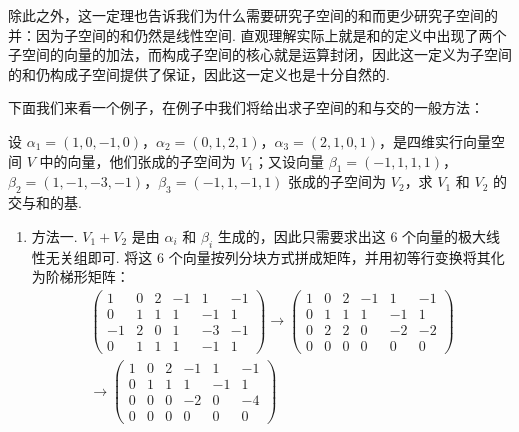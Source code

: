 除此之外，这一定理也告诉我们为什么需要研究子空间的和而更少研究子空间的并：因为子空间的和仍然是线性空间. 直观理解实际上就是和的定义中出现了两个子空间的向量的加法，而构成子空间的核心就是运算封闭，因此这一定义为子空间的和仍构成子空间提供了保证，因此这一定义也是十分自然的.

下面我们来看一个例子，在例子中我们将给出求子空间的和与交的一般方法：
\begin{example}{}{}
    设 $\alpha_1 = (1, 0, -1, 0)$，$\alpha_2 = (0, 1, 2, 1)$，$\alpha_3 = (2, 1, 0, 1)$，是四维实行向量空间 $V$ 中的向量，他们张成的子空间为 $V_1$；又设向量 $\beta_1 = (-1, 1, 1, 1)$，$\beta_2 = (1, -1, -3, -1)$，$\beta_3 = (-1, 1, -1, 1)$ 张成的子空间为 $V_2$，求 $V_1$ 和 $V_2$ 的交与和的基.
\end{example}

\begin{solution}
    \begin{enumerate}
        \item 方法一.  $V_1 +V_2$ 是由 $\alpha_i$ 和 $\beta_i$ 生成的，因此只需要求出这 $6$ 个向量的极大线性无关组即可. 将这 $6$ 个向量按列分块方式拼成矩阵，并用初等行变换将其化为阶梯形矩阵：
              \begin{align*}
                  \begin{pmatrix}
                      1  & 0 & 2 & -1 & 1  & -1 \\
                      0  & 1 & 1 & 1  & -1 & 1  \\
                      -1 & 2 & 0 & 1  & -3 & -1 \\
                      0  & 1 & 1 & 1  & -1 & 1
                  \end{pmatrix}
                  \xrightarrow{}
                  \begin{pmatrix}
                      1 & 0 & 2 & -1 & 1  & -1 \\
                      0 & 1 & 1 & 1  & -1 & 1  \\
                      0 & 2 & 2 & 0  & -2 & -2 \\
                      0 & 0 & 0 & 0  & 0  & 0
                  \end{pmatrix} \\
                  \xrightarrow{}
                  \begin{pmatrix}
                      1 & 0 & 2 & -1 & 1  & -1 \\
                      0 & 1 & 1 & 1  & -1 & 1  \\
                      0 & 0 & 0 & -2 & 0  & -4 \\
                      0 & 0 & 0 & 0  & 0  & 0
                  \end{pmatrix}
              \end{align*}


\end{enumerate}
\end{solution}
